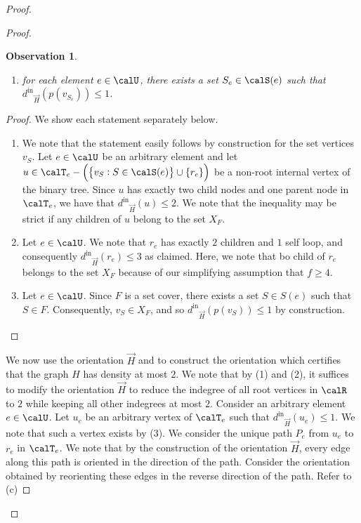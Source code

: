 \documentclass{article}
\newtheorem{observation}{Observation}[section]
\newcommand{\indegree}{\ensuremath{d^{\text{in}}}\xspace}
\begin{document}
\begin{proof}
\begin{proof}
\begin{observation}
\begin{enumerate}
            \item for each element $e \in \calU$, there exists a set $S_e \in \calS(e)$ such that $\indegree_{\vec{H}}(p(v_{S_e})) \leq 1$.
        \end{enumerate}
        \end{observation}
        \begin{proof}
            We show each statement separately below.
            \begin{enumerate}
                \item We note that the statement easily follows by construction for the set vertices $v_S$. Let $e \in \calU$ be an arbitrary element and let $u \in \calT_e - \left(\left\{v_S : S \in \calS(e)\right\} \cup \left\{r_e\right\}\right)$ be a non-root internal vertex of the binary tree. Since $u$ has exactly two child nodes and one parent node in $\calT_e$, we have that $\indegree_{\vec{H}}(u) \leq 2$. We note that the inequality may be strict if any children of $u$ belong to the set $X_F$.
                \item Let $e \in \calU$. We note that $r_e$ has exactly $2$ children and $1$ self loop, and consequently $\indegree_{\vec{H}}(r_e) \leq 3$ as claimed. Here, we note that bo child of $r_e$ belongs to the set $X_F$ because of our simplifying assumption that $f \geq 4$.
                \item Let $e \in \calU$. 
Since $F$ is a set cover, there exists a set $S \in S(e)$ such that $S \in F$. Consequently, $v_S \in X_F$, and so $\indegree_{\vec{H}}(p(v_S)) \leq 1$ by construction.
            \end{enumerate}
        \end{proof}
        We now use the orientation $\vec{H}$ and  to construct the orientation which certifies that the graph $H$ has density at most $2$. We note that by (1) and (2), it suffices to modify the orientation $\vec{H}$ to reduce the indegree of all root vertices in $\calR$ to $2$ while keeping all other indegrees at most $2$. Consider an arbitrary element $e \in \calU$. Let $u_e$ be an arbitrary vertex of $\calT_e$ such that $\indegree_{\vec{H}}(u_e) \leq 1$. We note that such a vertex exists by (3). We consider the unique path $P_e$ from $u_e$ to $r_e$ in $\calT_e$. We note that by the construction of the orientation $\vec{H}$, every edge along this path is oriented in the direction of the path. Consider the orientation obtained by reorienting these edges in the reverse direction of the path. Refer to (c)

\end{proof}
\end{proof}
\end{document}

